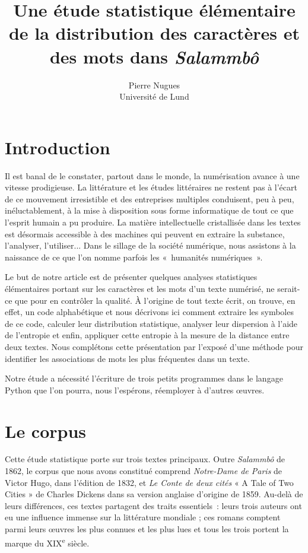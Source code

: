 \documentclass[]{article}
\title{Une étude statistique élémentaire de la distribution des caractères et des mots dans \textit{Salammbô}}
\author{Pierre Nugues\\Université de Lund}
\begin{document}
\maketitle

\section{Introduction}
Il est banal de le constater, partout dans le monde, la numérisation avance à une vitesse prodigieuse. La littérature et les études littéraires ne restent pas à l'écart de ce mouvement irresistible et des entreprises multiples conduisent, peu à peu, inéluctablement, à la mise à disposition sous forme informatique de tout ce que l'esprit humain a pu produire. La matière intellectuelle cristallisée dans les textes est désormais accessible à des machines qui peuvent en extraire la substance, l'analyser, l'utiliser... Dans le sillage de la société numérique, nous assistons à la naissance de ce que l'on nomme parfois les «~humanités numériques~».

Le but de notre article est de présenter quelques analyses statistiques élémentaires portant sur les caractères et les mots d'un texte numérisé, ne serait-ce que pour en contrôler la qualité. À l'origine de tout texte écrit, on trouve, en effet, un code alphabétique et nous décrivons ici comment extraire les symboles de ce code, calculer leur distribution statistique, analyser leur dispersion à l'aide de l'entropie et enfin, appliquer cette entropie à la mesure de la distance entre deux textes. Nous complétons cette présentation par l'exposé d'une méthode pour identifier les associations de mots les plus fréquentes dans un texte.

Notre étude a nécessité l'écriture de trois petits programmes dans le langage Python que l'on pourra, nous l'espérons, réemployer à d'autres œuvres.

\section{Le corpus}
Cette étude statistique porte sur trois textes principaux. Outre \textit{Salammbô} de 1862, le corpus que nous avons constitué comprend \textit{Notre-Dame de Paris} de Victor Hugo, dans l'édition de 1832, et \textit{Le Conte de deux cités} « A Tale of Two Cities » de Charles Dickens dans sa version anglaise d'origine de 1859. Au-delà de leurs différences, ces textes partagent des traits essentiels~: leurs trois auteurs ont eu une influence immense sur la littérature mondiale ; ces romans comptent parmi leurs œuvres les plus connues et les plus lues et tous les trois portent la marque du XIX\textsuperscript{e} siècle.
\end{document}
